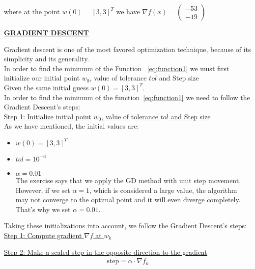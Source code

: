 where at the point $w\left(0\right) = \left[3, 3\right]^T$ we have $\nabla f(x) = \left(\begin{array}{c}
	-53 \\
	-19
\end{array}\right)$
\\[4mm]

\begin{center}
	\underline{\textbf{GRADIENT DESCENT}}
\end{center}
Gradient descent is one of the most favored optimization technique, because of its simplicity and its generality.\\
In order to find the minimum of the Function ~\ref{eq:function1} we must first initialize our initial point $w_{0}$, value of tolerance $tol$ and Step size\\
Given the same initial guess $w\left(0\right) = \left[3, 3\right]^T$. \\
In order to find the minimum of the function~\ref{eq:function1} we need to follow the Gradient Descent's steps:\\

\underline{Step 1: Initialize initial point $w_{0}$, value of tolerance $tol$ and Step size}\\
As we have mentioned, the initial values are:
\begin{itemize}
	\item $w\left(0\right) = \left[3, 3\right]^T$
	\item $tol = 10^{-6}$
	\item $\alpha = 0.01$\\
	The exercise says that we apply the GD method with unit step movement. However, if we set $\alpha = 1$, which is considered a large value, the algorithm may not converge to the optimal point and it will even diverge completely. That's why we set $\alpha = 0.01$. 
\end{itemize} 
\vspace{2mm}

Taking these initializations into account, we follow the Gradient Descent's steps:\\

\underline{Step 1: Compute gradient $\nabla f$ at $w_{k}$}
\vspace{4mm}

\underline{Step 2: Make a scaled step in the opposite direction to the gradient}\\
\begin{equation}
	\begin{gathered}
		\text{step} = \alpha \cdot \nabla f_{k}\\
	\end{gathered}
\end{equation}
\vspace{2mm}

